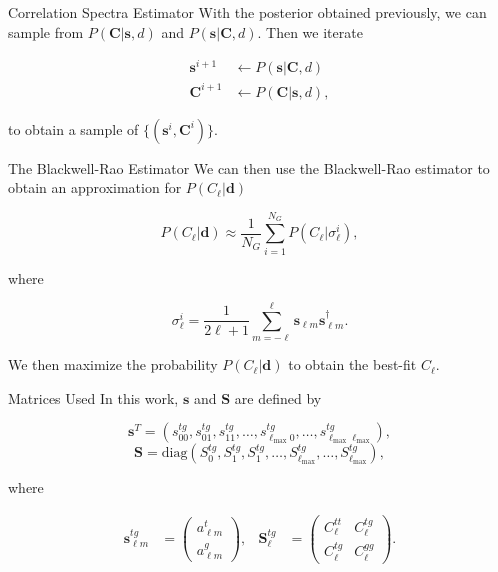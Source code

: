 \documentclass[serif, aspectratio=169]{beamer}
\begin{document}
\begin{frame}{Correlation Spectra Estimator}
     With the posterior obtained previously, we can sample from $P(\mathbf{C}|\mathbf{s},d)$ and $P(\mathbf{s}|\mathbf{C},d)$. Then we iterate

    \begin{align}
        \mathbf{s}^{i+1}&\leftarrow P(\mathbf{s}|\mathbf{C},d)\\
        \mathbf{C}^{i+1}&\leftarrow P(\mathbf{C}|\mathbf{s},d),
    \end{align}

    to obtain a sample of $\{(\mathbf{s}^i, \mathbf{C}^i)\}$.
\end{frame}

\begin{frame}{The Blackwell-Rao Estimator}
    We can then use the Blackwell-Rao estimator to obtain an approximation for $P(C_\ell|\mathbf{d})$

    \begin{equation}
        P(C_\ell|\mathbf{d})\approx \frac{1}{N_G}\sum_{i=1}^{N_G}P(C_\ell|\sigma_\ell^i),
    \end{equation}

    where

    \begin{equation}
        \sigma_\ell^i = \frac{1}{2\ell+1}\sum_{m=-\ell}^\ell \mathbf{s}_{\ell m}\mathbf{s}_{\ell m}^\dagger.
    \end{equation}

    We then maximize the probability $P(C_\ell|\mathbf{d})$ to obtain the best-fit $C_\ell$. 
\end{frame}

\begin{frame}{Matrices Used}
	In this work, $\mathbf{s}$ and $\mathbf{S}$ are defined by
	
	\begin{equation}\label{vec_s}
	\mathbf{s}^T=(s_{00}^{tg}, s_{01}^{tg}, s_{11}^{tg}, \dots, s_{\ell_\text{max}0}^{tg}, \dots, s_{\ell_\text{max} \ell_\text{max}}^{tg}),
\end{equation}
\begin{equation}\label{matrix_S}
	\mathbf{S}=\text{diag}(S_0^{tg}, S_1^{tg}, S_1^{tg},\dots, S_{\ell_\text{max}}^{tg}, \dots, S_{\ell_\text{max}}^{tg}),
\end{equation}

where 

\begin{align}\label{s_lm=}
	\mathbf{s}_{\ell m}^{tg}&=
	\begin{pmatrix}
	a_{\ell m}^t\\
	a_{\ell m}^g
	\end{pmatrix}, &
	\mathbf{S}_\ell^{tg}&=
	\begin{pmatrix}
	C_\ell^{tt} & C_\ell^{tg}\\
	C_\ell^{tg} & C_\ell^{gg}
	\end{pmatrix}.
\end{align}

\end{frame}
\end{document}
